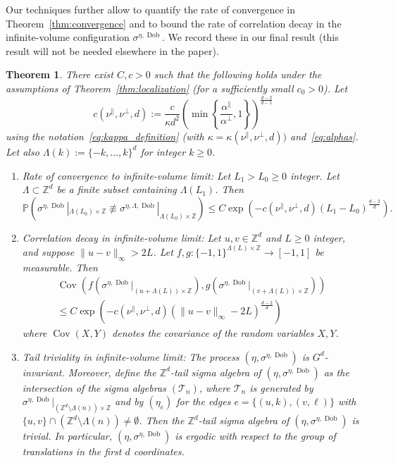 \documentclass[11pt, reqno]{amsart}
\newtheorem{theorem}{Theorem}[section]
\newcommand{\Z}{\mathbb{Z}}
\DeclareMathOperator{\Dob}{Dob}
\renewcommand{\P}{\mathbb{P}}
\DeclareMathOperator{\cov}{Cov}
\numberwithin{equation}{section}
\begin{document}
Our techniques further allow to quantify the rate of convergence in Theorem~\ref{thm:convergence} and to bound the rate of correlation decay in the infinite-volume configuration $\sigma^{\eta,\Dob}$. We record these in our final result (this result will not be needed elsewhere in the paper).
\begin{theorem}\label{thm:decay of correlations and rate of convergence}
There exist $C,c>0$ such that the following holds under the assumptions of Theorem~\ref{thm:localization} (for a sufficiently small $c_0>0$). Let
\begin{equation}
c(\nu^{\parallel},\nu^{\perp},d):=\frac{c}{\kappa  d^2} \left( \min \left\{\frac{\alpha^{\parallel}}{\alpha^{\perp}},1\right\}\right)^{\frac{d-2}{d-1}}
\end{equation}
using the notation~\eqref{eq:kappa_definition} (with $\kappa = \kappa(\nu^\parallel, \nu^\perp,d))$ and~\eqref{eq:alphas}.
Let also $\Lambda(k):= \{-k,\dots, k\}^{d}$ for integer $k\ge 0$.
\begin{enumerate}
\item \emph{Rate of convergence to infinite-volume limit}:
Let $L_1>L_0\ge 0$ integer. Let $\Lambda\subset\Z^d$ be a finite subset containing $\Lambda(L_1)$. Then 
\begin{equation}\label{eq:rate of convergence}
\P\left(\sigma^{\eta,\Dob}|_{\Lambda(L_0)\times\Z}\not\equiv \sigma^{\eta,\Lambda,\Dob}|_{\Lambda(L_0)\times\Z}\right)\le C\exp \left(-c(\nu^{\parallel},\nu^{\perp},d)\left(L_1 - L_0\right)^{\frac{d-2}{d}} \right).
\end{equation}
\item \emph{Correlation decay in infinite-volume limit}:
Let $u,v\in\Z^d$ and $L\ge 0$ integer, and suppose $\|u-v\|_\infty>2L$. Let $f,g:\{-1,1\}^{\Lambda(L)\times\Z}\to[-1,1]$ be measurable. Then
\begin{multline}\label{eq:correlation decay estimate}
\cov(f(\sigma^{\eta,\Dob}|_{(u+\Lambda(L))\times\Z}),g(\sigma^{\eta,\Dob}|_{(v+\Lambda(L))\times\Z}))\\
\le C\exp \left(-c(\nu^{\parallel},\nu^{\perp},d)\left(\|u-v\|_\infty-2L\right)^{\frac{d-2}{d}} \right)
\end{multline}
where $\cov(X,Y)$ denotes the covariance of the random variables $X,Y$.
\item \emph{Tail triviality in infinite-volume limit}:
The process $(\eta,\sigma^{\eta,\Dob})$ is $G^d$-invariant. Moreover, define the $\Z^d$-tail sigma algebra of $(\eta,\sigma^{\eta,\Dob})$ as the intersection of the sigma algebras $(\mathcal{T}_n)$, where $\mathcal{T}_n$ is generated by $\sigma^{\eta,\Dob}|_{(\Z^d\setminus\Lambda(n))\times\Z}$ and by $(\eta_e)$ for the edges $e = \{(u,k),(v,\ell)\}$ with $\{u,v\}\cap(\Z^d\setminus\Lambda(n))\neq\emptyset$. Then the $\Z^d$-tail sigma algebra of $(\eta,\sigma^{\eta,\Dob})$ is trivial. In particular, $(\eta,\sigma^{\eta,\Dob})$ is ergodic with respect to the group of translations in the first $d$ coordinates.
\end{enumerate}
\end{theorem}
\end{document}

